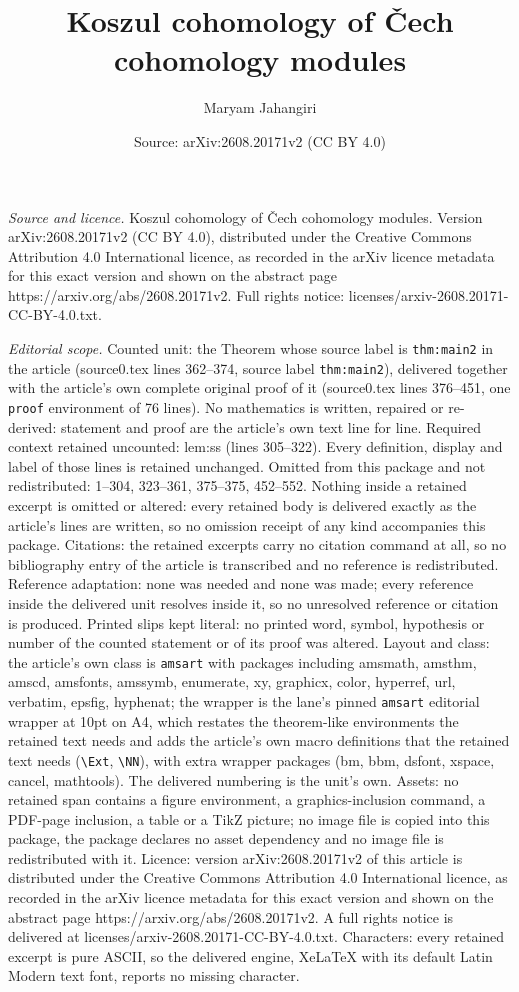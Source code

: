 \documentclass[10pt,a4paper]{amsart}
\title[Koszul cohomology of \v{C}ech cohomology modules]{Koszul cohomology of \v{C}ech cohomology modules}
\author{Maryam Jahangiri}
\date{Source: arXiv:2608.20171v2 (CC BY 4.0)}
\begin{document}
\maketitle

\noindent\emph{Source and licence.} Koszul cohomology of \v{C}ech cohomology modules. Version arXiv:2608.20171v2 (CC BY 4.0), distributed under the Creative Commons Attribution 4.0 International licence, as recorded in the arXiv licence metadata for this exact version and shown on the abstract page https://arxiv.org/abs/2608.20171v2. Full rights notice: licenses/arxiv-2608.20171-CC-BY-4.0.txt.\par\smallskip

\noindent\textit{Editorial scope.} Counted unit: the Theorem whose source label is \texttt{thm:main2} in the article (source0.tex lines 362--374, source label \texttt{thm:main2}), delivered together with the article's own complete original proof of it (source0.tex lines 376--451, one \texttt{proof} environment of 76 lines). No mathematics is written, repaired or re-derived: statement and proof are the article's own text line for line. Required context retained uncounted: lem:ss (lines 305--322). Every definition, display and label of those lines is retained unchanged. Omitted from this package and not redistributed: 1--304, 323--361, 375--375, 452--552. Nothing inside a retained excerpt is omitted or altered: every retained body is delivered exactly as the article's lines are written, so no omission receipt of any kind accompanies this package. Citations: the retained excerpts carry no citation command at all, so no bibliography entry of the article is transcribed and no reference is redistributed. Reference adaptation: none was needed and none was made; every reference inside the delivered unit resolves inside it, so no unresolved reference or citation is produced. Printed slips kept literal: no printed word, symbol, hypothesis or number of the counted statement or of its proof was altered. Layout and class: the article's own class is \texttt{amsart} with packages including amsmath, amsthm, amscd, amsfonts, amssymb, enumerate, xy, graphicx, color, hyperref, url, verbatim, epsfig, hyphenat; the wrapper is the lane's pinned \texttt{amsart} editorial wrapper at 10pt on A4, which restates the theorem-like environments the retained text needs and adds the article's own macro definitions that the retained text needs (\texttt{\textbackslash Ext}, \texttt{\textbackslash NN}), with extra wrapper packages (bm, bbm, dsfont, xspace, cancel, mathtools). The delivered numbering is the unit's own. Assets: no retained span contains a figure environment, a graphics-inclusion command, a PDF-page inclusion, a table or a TikZ picture; no image file is copied into this package, the package declares no asset dependency and no image file is redistributed with it. Licence: version arXiv:2608.20171v2 of this article is distributed under the Creative Commons Attribution 4.0 International licence, as recorded in the arXiv licence metadata for this exact version and shown on the abstract page https://arxiv.org/abs/2608.20171v2. A full rights notice is delivered at licenses/arxiv-2608.20171-CC-BY-4.0.txt. Characters: every retained excerpt is pure ASCII, so the delivered engine, XeLaTeX with its default Latin Modern text font, reports no missing character.
\end{document}
